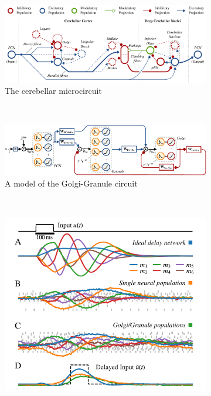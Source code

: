 \documentclass[10pt,letterpaper,oneside]{article}
\begin{document}
\begin{figure}[p]
	\begin{subfigure}{\textwidth}
		\centering
		\includegraphics[scale=0.95]{media/cerebellum_anatomy.pdf}
		\caption{The cerebellar microcircuit}
		\label{fig:cerebellum_anatomy}
	\end{subfigure}\\[0.25cm]
	\begin{subfigure}{\textwidth}
		\centering
		\includegraphics[scale=0.95]{media/delay_network_dale.pdf}
		\caption{A model of the Golgi-Granule circuit}
		\label{fig:delay_network_dale}
	\end{subfigure}\\[0.25cm]
	\begin{subfigure}{\textwidth}
		\centering
		\includegraphics[scale=0.95]{media/delay_network_response.pdf}

\end{subfigure}
\end{figure}
\end{document}
